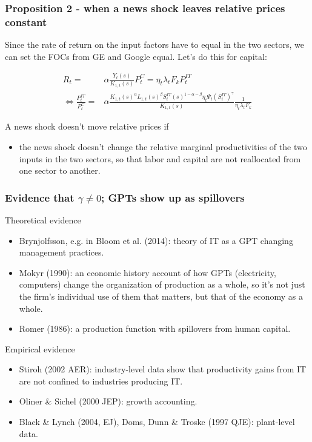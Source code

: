 \documentclass{beamer}
\begin{document}
\begin{frame}
\frametitle{Proposition 2 - when a news shock leaves relative prices constant}

Since the rate of return on the input factors have to equal in the two sectors, we can set the FOCs from GE and Google equal. Let's do this for capital:

\begin{align*}
R_t = & \alpha \frac{Y_t(s)}{K_{1,t}(s)} P^C_t = \eta_t \lambda_t F_k P^{IT}_t \\
\Leftrightarrow \frac{P^{IT}_t }{P^{C}_t } = & \alpha \frac{K_{1,t}(s)^{\alpha}L_{1,t}(s)^{\beta}S^{IT}_t(s)^{1-\alpha - \beta}\eta_t \Psi_t (S^{IT}_t)^{\gamma} }{K_{1,t}(s)} \frac{1}{\eta_t \lambda_t F_k}
\end{align*}


A news shock doesn't move relative prices if 
\begin{itemize}
\item the news shock doesn't change the relative marginal productivities of the two inputs in the two sectors, so that labor and capital are not reallocated from one sector to another.
\end{itemize}

\end{frame}

\begin{frame}
\frametitle{Evidence that $\gamma \neq 0$; GPTs show up as spillovers}

Theoretical evidence
\begin{itemize}
\item Brynjolfsson, e.g. in Bloom et al. (2014): theory of IT as a GPT changing management practices.
\item Mokyr (1990):  an economic history account of how GPTs (electricity, computers) change the organization of production as a whole, so it's not just the firm's individual use of them that matters, but that of the economy as a whole.
\item Romer (1986): a production function with spillovers from human capital.
\end{itemize}

Empirical evidence
\begin{itemize}
\item Stiroh (2002 AER): industry-level data show that productivity gains from IT are not confined to industries producing IT.
\item Oliner \& Sichel (2000 JEP): growth accounting.
\item Black \& Lynch (2004, EJ), Doms, Dunn \& Troske (1997 QJE): plant-level data.
\end{itemize}

\end{frame}
\end{document}
